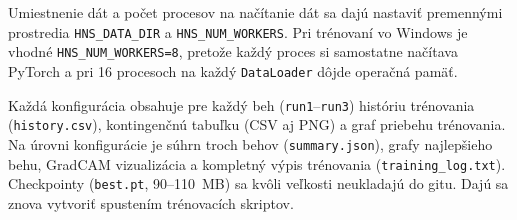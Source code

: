 \noindent Umiestnenie dát a počet procesov na načítanie dát sa dajú
nastaviť premennými prostredia \texttt{HNS\_DATA\_DIR}
a \texttt{HNS\_NUM\_WORKERS}. Pri trénovaní vo Windows je vhodné
\texttt{HNS\_NUM\_WORKERS=8}, pretože každý proces si samostatne načítava
PyTorch a pri 16 procesoch na každý \texttt{DataLoader} dôjde operačná
pamäť.

\noindent Každá konfigurácia obsahuje pre každý beh (\texttt{run1}--\texttt{run3})
históriu trénovania (\texttt{history.csv}), kontingenčnú tabuľku (CSV aj PNG)
a graf priebehu trénovania. Na úrovni konfigurácie je súhrn troch behov
(\texttt{summary.json}), grafy najlepšieho behu, GradCAM vizualizácia
a kompletný výpis trénovania (\texttt{training\_log.txt}). Checkpointy
(\texttt{best.pt}, 90--110~MB)
sa kvôli veľkosti neukladajú do gitu. Dajú sa znova vytvoriť spustením
trénovacích skriptov.

